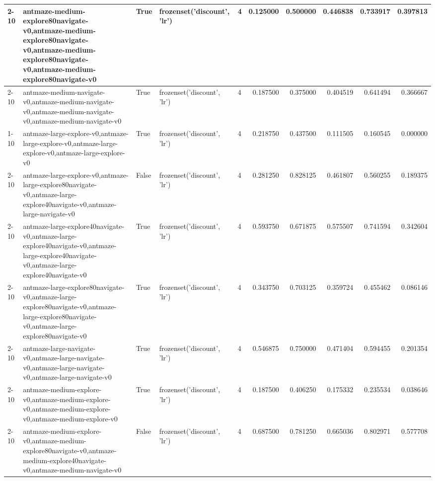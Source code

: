 \begin{tabular}{lllllrrrrr}
\cline{2-10} \cline{3-10} \cline{4-10}
 & antmaze-medium-explore80navigate-v0,antmaze-medium-explore80navigate-v0,antmaze-medium-explore80navigate-v0,antmaze-medium-explore80navigate-v0 & True & frozenset({'discount', 'lr'}) & 4 & 0.125000 & 0.500000 & 0.446838 & 0.733917 & 0.397813 \\
\cline{2-10} \cline{3-10} \cline{4-10}
 & antmaze-medium-navigate-v0,antmaze-medium-navigate-v0,antmaze-medium-navigate-v0,antmaze-medium-navigate-v0 & True & frozenset({'discount', 'lr'}) & 4 & 0.187500 & 0.375000 & 0.404519 & 0.641494 & 0.366667 \\
\cline{1-10} \cline{2-10} \cline{3-10} \cline{4-10}
\multirow[t]{10}{*}{QRL} & antmaze-large-explore-v0,antmaze-large-explore-v0,antmaze-large-explore-v0,antmaze-large-explore-v0 & True & frozenset({'discount', 'lr'}) & 4 & 0.218750 & 0.437500 & 0.111505 & 0.160545 & 0.000000 \\
\cline{2-10} \cline{3-10} \cline{4-10}
 & antmaze-large-explore-v0,antmaze-large-explore80navigate-v0,antmaze-large-explore40navigate-v0,antmaze-large-navigate-v0 & False & frozenset({'discount', 'lr'}) & 4 & 0.281250 & 0.828125 & 0.461807 & 0.560255 & 0.189375 \\
\cline{2-10} \cline{3-10} \cline{4-10}
 & antmaze-large-explore40navigate-v0,antmaze-large-explore40navigate-v0,antmaze-large-explore40navigate-v0,antmaze-large-explore40navigate-v0 & True & frozenset({'discount', 'lr'}) & 4 & 0.593750 & 0.671875 & 0.575507 & 0.741594 & 0.342604 \\
\cline{2-10} \cline{3-10} \cline{4-10}
 & antmaze-large-explore80navigate-v0,antmaze-large-explore80navigate-v0,antmaze-large-explore80navigate-v0,antmaze-large-explore80navigate-v0 & True & frozenset({'discount', 'lr'}) & 4 & 0.343750 & 0.703125 & 0.359724 & 0.455462 & 0.086146 \\
\cline{2-10} \cline{3-10} \cline{4-10}
 & antmaze-large-navigate-v0,antmaze-large-navigate-v0,antmaze-large-navigate-v0,antmaze-large-navigate-v0 & True & frozenset({'discount', 'lr'}) & 4 & 0.546875 & 0.750000 & 0.471404 & 0.594455 & 0.201354 \\
\cline{2-10} \cline{3-10} \cline{4-10}
 & antmaze-medium-explore-v0,antmaze-medium-explore-v0,antmaze-medium-explore-v0,antmaze-medium-explore-v0 & True & frozenset({'discount', 'lr'}) & 4 & 0.187500 & 0.406250 & 0.175332 & 0.235534 & 0.038646 \\
\cline{2-10} \cline{3-10} \cline{4-10}
 & antmaze-medium-explore-v0,antmaze-medium-explore80navigate-v0,antmaze-medium-explore40navigate-v0,antmaze-medium-navigate-v0 & False & frozenset({'discount', 'lr'}) & 4 & 0.687500 & 0.781250 & 0.665036 & 0.802971 & 0.577708 \\

\end{tabular}
